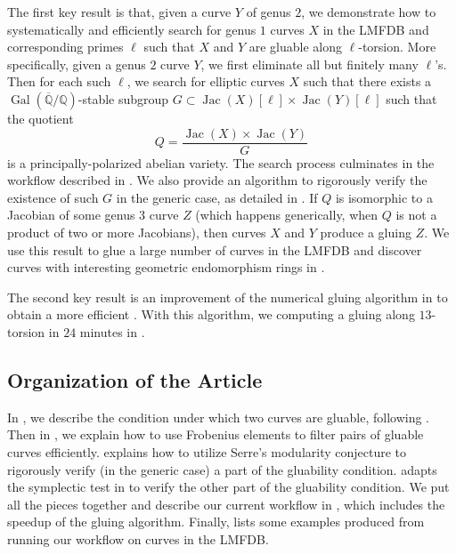 \documentclass{amsproc}
\numberwithin{equation}{section}
\theoremstyle{definition}
\theoremstyle{remark}
\DeclareMathOperator{\Jac}{Jac}
\DeclareMathOperator{\Gal}{Gal}
\newcommand{\QQ}{\mathbb Q}
\newcommand{\Qbar}{\overline{\QQ}}
\newcommand{\GalQ}{\Gal(\Qbar/\QQ)}
\begin{document}
The first key result is that, given a curve $Y$ of genus $2$, we demonstrate how to systematically and efficiently search for genus $1$ curves $X$ in the LMFDB and corresponding primes $\ell$ such that $X$ and $Y$ are gluable along $\ell$-torsion.
More specifically, given a genus $2$ curve $Y$, we first eliminate all but finitely many $\ell$'s. Then for each such $\ell$, we search for elliptic curves $X$ such that there exists a $\GalQ$-stable subgroup $G\subset\Jac(X)[\ell]\times \Jac(Y)[\ell]$ such that the quotient
\begin{equation}
    Q = \frac{\Jac(X)\times \Jac(Y)}{G}
\end{equation}
is a principally-polarized abelian variety. The search process culminates in the workflow described in .
We also provide an algorithm to rigorously verify the existence of such $G$ in the generic case, as detailed in .
If $Q$ is isomorphic to a Jacobian of some genus $3$ curve $Z$  (which happens generically, when $Q$ is not a product of two or more Jacobians), then curves $X$ and $Y$ produce a gluing $Z$. We use this result to glue a large number of curves in the LMFDB and discover curves with interesting geometric endomorphism rings in .

The second key result is an improvement of the numerical gluing algorithm in \cite[\S 2.1]{1_plus_2_2_torsion_gluing} to obtain a more efficient .
With this algorithm, we computing a gluing along $13$-torsion in $24$ minutes in .


\subsection{Organization of the Article}

In , we describe the condition under which two curves are gluable, following \cite{1_plus_2_2_torsion_gluing}. Then in , we explain how to use Frobenius elements to filter pairs of gluable curves efficiently.  explains how to utilize Serre's modularity conjecture to rigorously verify (in the generic case) a part of the gluability condition.  adapts the symplectic test in \cite{local_symplectic_type} to verify the other part of the gluability condition. We put all the pieces together and describe our current workflow in , which includes the speedup of the gluing algorithm.
Finally,  lists some examples produced from running our workflow on curves in the LMFDB.
\end{document}
